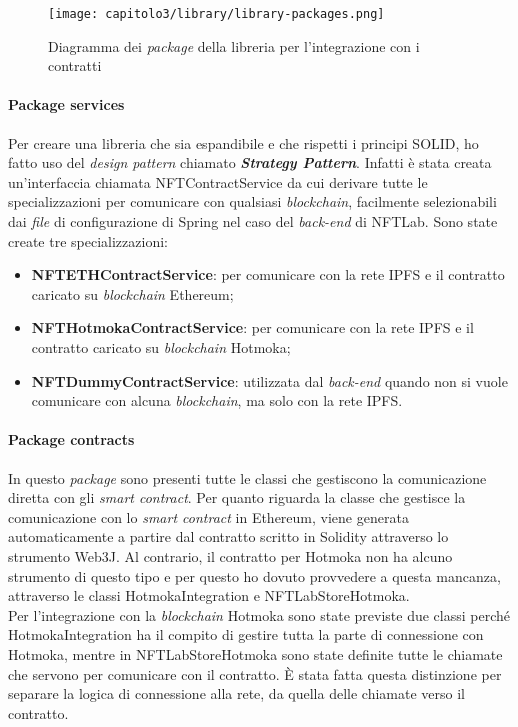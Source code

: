 \clearpage
\begin{figure}[h!]
  \centering
  \texttt{[image: capitolo3/library/library-packages.png]}
  \caption{Diagramma dei \textit{package} della libreria per l'integrazione con i contratti}
\end{figure}

\paragraph{Package services} Per creare una libreria che sia espandibile e che rispetti i principi SOLID, ho fatto uso del \textit{design pattern} chiamato \textit{\textbf{Strategy Pattern}}. Infatti è stata creata un'interfaccia chiamata NFTContractService da cui derivare tutte le specializzazioni per comunicare con qualsiasi \textit{blockchain}, facilmente selezionabili dai \textit{file} di configurazione di Spring nel caso del \textit{back-end} di NFTLab. Sono state create tre specializzazioni:
\begin{itemize}
  \item \textbf{NFTETHContractService}: per comunicare con la rete IPFS e il contratto caricato su \textit{blockchain} Ethereum;
  \item \textbf{NFTHotmokaContractService}: per comunicare con la rete IPFS e il contratto caricato su \textit{blockchain} Hotmoka;
  \item \textbf{NFTDummyContractService}: utilizzata dal \textit{back-end} quando non si vuole comunicare con alcuna \textit{blockchain}, ma solo con la rete IPFS.
\end{itemize}

\paragraph{Package contracts} In questo \textit{package} sono presenti tutte le classi che gestiscono la comunicazione diretta con gli \textit{smart contract}. Per quanto riguarda la classe che gestisce la comunicazione con lo \textit{smart contract} in Ethereum, viene generata automaticamente a partire dal contratto scritto in Solidity attraverso lo strumento Web3J. Al contrario, il contratto per Hotmoka non ha alcuno strumento di questo tipo e per questo ho dovuto provvedere a questa mancanza, attraverso le classi HotmokaIntegration e NFTLabStoreHotmoka. \\

Per l'integrazione con la \textit{blockchain} Hotmoka sono state previste due classi perché HotmokaIntegration ha il compito di gestire tutta la parte di connessione con Hotmoka, mentre in NFTLabStoreHotmoka sono state definite tutte le chiamate che servono per comunicare con il contratto. È stata fatta questa distinzione per separare la logica di connessione alla rete, da quella delle chiamate verso il contratto.


